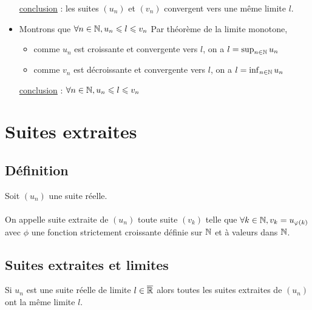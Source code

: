 \begin{dem}
\begin{itemize}
        \underline{conclusion} : les suites \((u_n)\) et \((v_n)\) convergent vers une même limite \(l\).
        \item Montrons que \(\forall n \in \mathbb{N}, u_n \leqslant  l \leqslant v_n\)
        Par théorème de la limite monotone, 
        \begin{itemize}
            \item comme \(u_n\) est croissante et convergente vers \(l\), on a \(l  = \sup_{n \in \mathbb{N}} u_n\)
            \item comme \(v_n\) est décroissante et convergente vers \(l\), on a \(l  = \inf_{n \in \mathbb{N}} u_n\)
        \end{itemize}
        \underline{conclusion} : \(\forall n \in \mathbb{N}, u_n \leqslant l \leqslant v_n\)
    \end{itemize}
    
\end{dem}

\section{Suites extraites}
\subsection{Définition}
\begin{defi}
    Soit \((u_n)\) une suite réelle.\\~\\
    On appelle suite extraite de \((u_n)\) toute suite \((v_k)\) telle que \(\forall k\in \mathbb{N}, v_k = u_{\varphi(k)}\) avec \(\phi\) une fonction strictement croissante définie sur \(\mathbb{N}\) et à valeurs dans \(\mathbb{N}\).
\end{defi}
\subsection{Suites extraites et limites}
\begin{prop}
Si \(u_n\) est une suite réelle de limite \(l \in \overline{\mathbb{R}}\) alors toutes les suites extraites de \((u_n)\) ont la même limite \(l\).
\end{prop}

